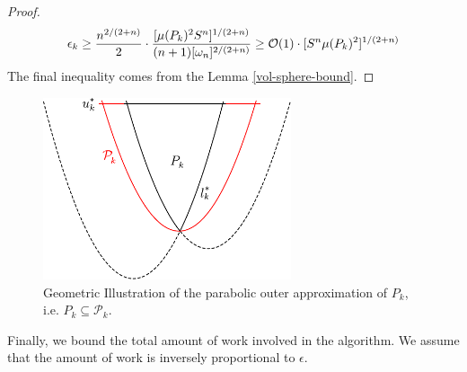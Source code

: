 \begin{proof}
\[
\epsilon_k \geq \frac{n^{2/(2+n)}}{2}\cdot \frac{[\mu(P_{k})^{2}S^{n}]^{1/(2+n)}}{(n+1)[\omega_{n}]^{2/(2+n)}}
\geq \mathcal{O}(1)\cdot[S{}^{n}\mu(P_k)^2]^{1/(2+n)}
\]
The final inequality comes from the Lemma \ref{vol-sphere-bound}.
\end{proof}

\begin{figure}
\begin{centering}
\includegraphics[width=0.65\textwidth]{cutting/fig4}
\par\end{centering}
\caption{Geometric Illustration of the parabolic outer approximation
of $P_k$, i.e. $P_k \subseteq \mathcal{P}_k$. \label{fig:parabolic_outer_approximation}}
\end{figure}


Finally, we bound the total amount of work involved in the algorithm. We assume that the amount of work is inversely proportional to $\epsilon$. 

